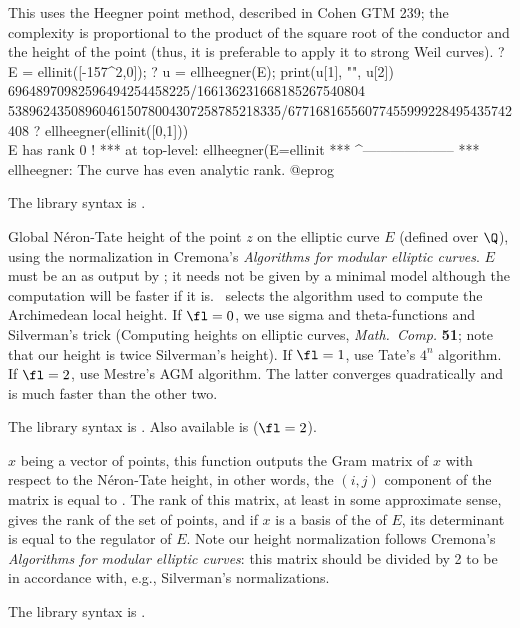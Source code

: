 This uses the Heegner point method, described in Cohen GTM 239; the complexity
is proportional to the product of the square root of the conductor and the
height of the point (thus, it is preferable to apply it to strong Weil curves).
\bprog
? E = ellinit([-157^2,0]);
? u = ellheegner(E); print(u[1], "\n", u[2])
69648970982596494254458225/166136231668185267540804
538962435089604615078004307258785218335/67716816556077455999228495435742408
? ellheegner(ellinit([0,1]))         \\ E has rank 0 !
 ***   at top-level: ellheegner(E=ellinit
 ***                 ^--------------------
 *** ellheegner: The curve has even analytic rank.
@eprog

The library syntax is .

\label{se:ellheight}
Global N\'eron-Tate height of the point $z$ on the elliptic curve
$E$ (defined over $\Q$), using the normalization in Cremona's
\emph{Algorithms for modular elliptic curves}. $E$
must be an  as output by ; it needs not be given by a
minimal model although the computation will be faster if it is. \fl\ selects
the algorithm used to compute the Archimedean local height. If $\fl=0$,
we use sigma and theta-functions and Silverman's trick (Computing
heights on elliptic curves, \emph{Math.~Comp.} {\bf 51}; note that
our height is twice Silverman's height). If
$\fl=1$, use Tate's $4^n$ algorithm. If $\fl=2$, use Mestre's AGM algorithm.
The latter converges quadratically and is much faster than the other two.

The library syntax is .
Also available is 
($\fl=2$).

\label{se:ellheightmatrix}
$x$ being a vector of points, this
function outputs the Gram matrix of $x$ with respect to the N\'eron-Tate
height, in other words, the $(i,j)$ component of the matrix is equal to
. The rank of this matrix, at least in some
approximate sense, gives the rank of the set of points, and if $x$ is a
basis of the  of $E$, its determinant is equal to
the regulator of $E$. Note our height normalization follows Cremona's
\emph{Algorithms for modular elliptic curves}: this matrix should be divided
by 2 to be in accordance with, e.g., Silverman's normalizations.

The library syntax is .

